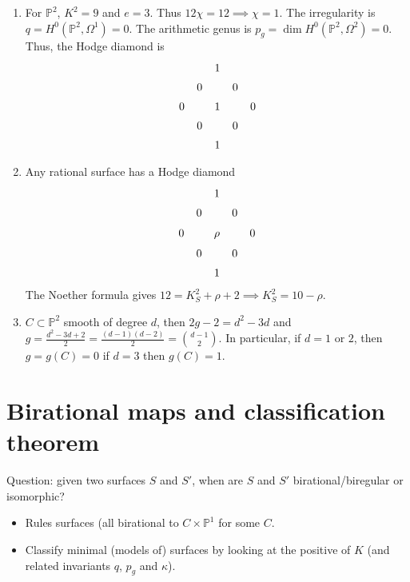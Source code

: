 \begin{example}
\label{example-big-theorems}
\begin{enumerate}
\item For $\mathbb{P}^2$, $K^2=9$ and $e=3$.
Thus $12\chi = 12 \implies \chi =1$.
The irregularity is
$q=H^0(\mathbb{P}^2,\Omega^1)=0$.
The arithmetic genus is $p_g=\dim
H^0(\mathbb{P}^2,\Omega^2)=0$.
Thus, the Hodge diamond is
$$
\xymatrix@C=.5em@R=.5em{
& & 1\\
& 0 && 0\\
0 && 1 && 0\\
& 0 && 0\\
& & 1
}
$$
\item Any rational surface has a Hodge
diamond
$$
\xymatrix@C=.5em@R=.5em{
& & 1\\
& 0 && 0\\
0 && \rho && 0\\
& 0 && 0\\
& & 1
}
$$
The Noether formula gives
$12=K_S^2+\rho+2 \implies K_S^2=10-\rho$.

\item $C \subset \mathbb{P}^2$ smooth of
degree $d$,
then $2g-2=d^2-3d$ and
$g=\frac{d^2-3d+2}{2}=\frac{(d-1)(d-2)}{2}
=\binom{d-1}{2}$.
In particular,
if $d=1$ or  $2$,
then  $g=g(C)=0$
if $d=3$ then  $g(C)=1$.
\end{enumerate}
\end{example}

\section{Birational maps and classification
theorem}
\label{section-birat-maps-class-theor}

\noindent
Question: given two surfaces $S$ and $S'$,
when are $S$ and $S'$ birational/biregular or
isomorphic?

\begin{itemize}
\item Rules surfaces
(all birational to $C\times \mathbb{P}^1$ for
some $C$.
\item Classify minimal (models of) surfaces
by looking at the positive of $K$
(and related invariants
$q$, $p_g$ and $\kappa$).
\end{itemize}

